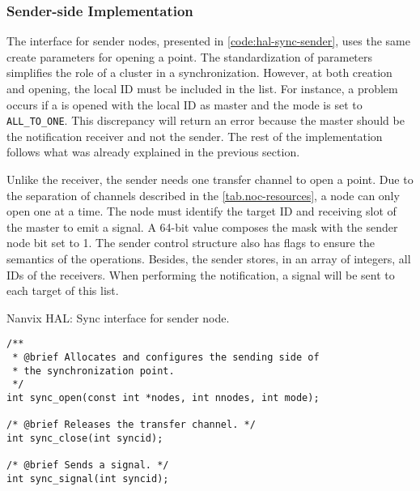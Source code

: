 			\subsubsection{Sender-side Implementation}

				The \sync interface for sender nodes, presented in
				\autoref{code:hal-sync-sender}, uses the same create parameters for
				opening a \sync point. The standardization of parameters simplifies
				the role of a cluster in a synchronization. However, at both creation
				and opening, the local ID must be included in the list. For instance,
				a problem occurs if a \sync is opened with the local ID as master and
				the mode is set to \texttt{ALL\_TO\_ONE}. This discrepancy will return an error
				because the master should be the notification receiver and not the
				sender. The rest of the implementation follows what was already
				explained in the previous section.

				Unlike the receiver, the sender needs one \cnoc transfer channel to
				open a \sync point. Due to the separation of channels described in
				the \autoref{tab.noc-resources}, a node can only open one \sync at
				a time. The node must identify the target ID and receiving slot of
				the master to emit a signal. A 64-bit value composes the mask with
				the sender node bit set to 1. The sender control structure also has
				flags to ensure the semantics of the operations. Besides, the sender
				stores, in an array of integers, all IDs of the receivers. When
				performing the notification, a signal will be sent to each target
				of this list.

\begin{listing}[!tb]
\caption{Nanvix HAL: Sync interface for sender node.}
\label{code:hal-sync-sender}
\begin{verbatim}
/**
 * @brief Allocates and configures the sending side of
 * the synchronization point.
 */
int sync_open(const int *nodes, int nnodes, int mode);

/* @brief Releases the transfer channel. */
int sync_close(int syncid);

/* @brief Sends a signal. */
int sync_signal(int syncid);
\end{verbatim}
\end{listing}

